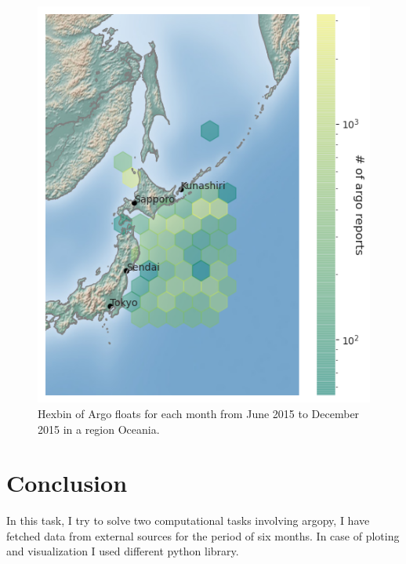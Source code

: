 \documentclass[12pt]{article}
\begin{document}
\begin{figure}[H]
\includegraphics[width=\textwidth,height=\textheight,keepaspectratio]{locations.png}
\caption{Hexbin of Argo floats for each month from June 2015 to December 2015  in a region Oceania.}
\label{fig:task 2}
 
\end{figure}

\section{Conclusion}
In this task, I try to solve two computational tasks involving argopy, I have fetched data from external sources for the period of six months. In case of ploting and visualization I used different python library.
\end{document}

